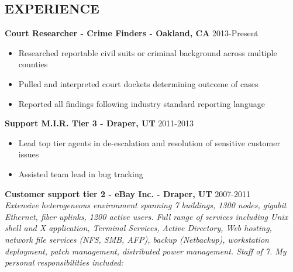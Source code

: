 \documentclass[line,margin]{res}
\begin{document}
\date{\today}
\address{\href{mailto:jefferycoombs@gmail.com}{jefferycoombs@gmail.com} \\ (415) 483-6437}

\begin{resume}

\section{EXPERIENCE}
 {\bf Court Researcher - Crime Finders - Oakland, CA} \hfill 2013-Present\\
  \begin{itemize} \itemsep -2pt %
  \item Researched reportable civil suits or criminal background across multiple counties
  \item Pulled and interpreted court dockets determining outcome of cases
  \item Reported all findings following industry standard reporting language
  \end{itemize}
 {\bf Support M.I.R. Tier 3 - Draper, UT} \hfill 2011-2013\\
  \begin{itemize} \itemsep -2pt %
  \item Lead top tier agents in de-escalation and resolution of sensitive customer issues
  \item Assisted team lead in bug tracking
  \end{itemize}
 {\bf Customer support tier 2 - eBay Inc. - Draper, UT} \hfill 2007-2011\\
 {\sl Extensive heterogeneous environment spanning 7 buildings, 1300 nodes, gigabit Ethernet, fiber uplinks, 1200 active users. Full range of services including Unix shell and X application, Terminal Services, Active Directory, Web hosting, network file services (NFS, SMB, AFP), backup (Netbackup), workstation deployment, patch management, distributed power management. Staff of 7. My personal responsibilities included:}

\end{resume}
\end{document}
